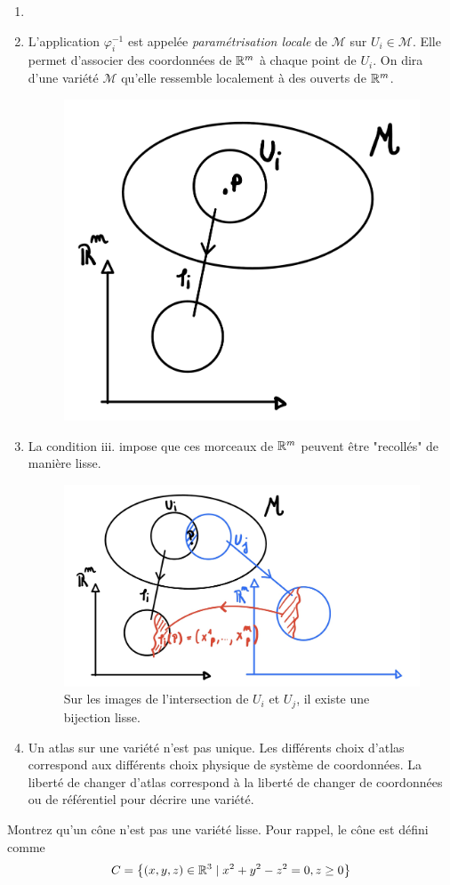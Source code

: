 \begin{rmk} 
    \begin{enumerate}
        \item[\,] 
        \item L'application $\varphi_i^{-1}$ est appelée \emph{paramétrisation locale} de $\mathcal{M}$ sur $U_i\in \mathcal{M}$. Elle permet d'associer des coordonnées de $\mathbb{R}^m$ à chaque point de $U_i$. On dira d'une variété $\mathcal{M}$ qu'elle ressemble localement à des ouverts de $\mathbb{R}^m$.
        \begin{figure}[H]
            \centering
            \includegraphics[width=0.3\linewidth]{Chapitres/3.Element de géométrie différentielle/Images/variété.jpg}
            \caption{}
            \label{fig:3.1}
        \end{figure}
        \item La condition iii. impose que ces morceaux de $\mathbb{R}^m$ peuvent être "recollés" de manière lisse.
        \begin{figure}[H]
            \centering
            \includegraphics[width=0.5\linewidth]{Chapitres/3.Element de géométrie différentielle/Images/ouvertchevauchement.jpg}
            \caption{Sur les images de l'intersection de $U_i$ et $U_j$, il existe une bijection lisse.}
            \label{fig:3.2}
        \end{figure}
        \item Un atlas sur une variété n'est pas unique. Les différents choix d'atlas correspond aux différents choix physique de système de coordonnées. La liberté de changer d'atlas correspond à la liberté de changer de coordonnées ou de référentiel pour décrire une variété.
    \end{enumerate}
\end{rmk}
    \begin{exerc}
        Montrez qu'un cône n'est pas une variété lisse. Pour rappel, le cône est défini comme 
        \begin{equation}
            C = \left\{ (x,y,z)\in \mathbb{R}^3 \mid x^2+y^2-z^2=0, z\geq 0 \right\}
        \end{equation}
    \end{exerc}
